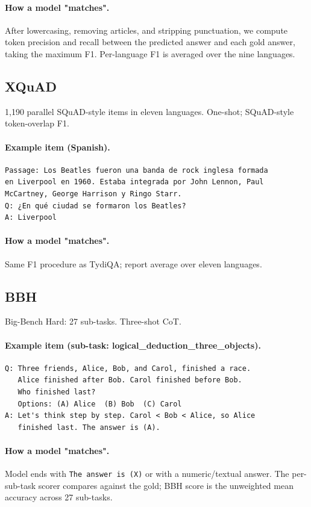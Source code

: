 \paragraph{How a model "matches".} After lowercasing, removing
articles, and stripping punctuation, we compute token precision and
recall between the predicted answer and each gold answer, taking
the maximum F1. Per-language F1 is averaged over the nine
languages.

\subsection{XQuAD}
\label{app:ex-xquad}

1{,}190 parallel SQuAD-style items in eleven languages. One-shot;
SQuAD-style token-overlap F1.

\paragraph{Example item (Spanish).}
\begin{verbatim}
Passage: Los Beatles fueron una banda de rock inglesa formada
en Liverpool en 1960. Estaba integrada por John Lennon, Paul
McCartney, George Harrison y Ringo Starr.
Q: ¿En qué ciudad se formaron los Beatles?
A: Liverpool
\end{verbatim}

\paragraph{How a model "matches".} Same F1 procedure as TydiQA;
report average over eleven languages.

\subsection{BBH}
\label{app:ex-bbh}

Big-Bench Hard: 27 sub-tasks. Three-shot CoT.

\paragraph{Example item (sub-task: logical\_deduction\_three\_objects).}
\begin{verbatim}
Q: Three friends, Alice, Bob, and Carol, finished a race.
   Alice finished after Bob. Carol finished before Bob.
   Who finished last?
   Options: (A) Alice  (B) Bob  (C) Carol
A: Let's think step by step. Carol < Bob < Alice, so Alice
   finished last. The answer is (A).
\end{verbatim}

\paragraph{How a model "matches".} Model ends with
\verb|The answer is (X)| or with a numeric/textual answer. The
per-sub-task scorer compares against the gold; BBH score is the
unweighted mean accuracy across 27 sub-tasks.
